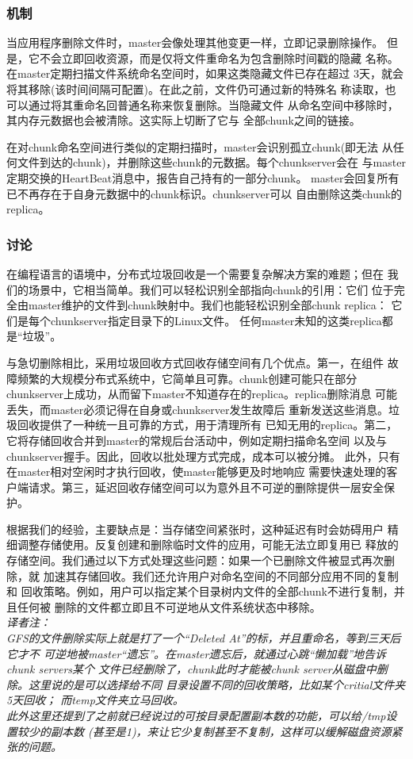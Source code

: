 \subsubsection{机制}
当应用程序删除文件时，master会像处理其他变更一样，立即记录删除操作。
但是，它不会立即回收资源，而是仅将文件重命名为包含删除时间戳的隐藏
名称。在master定期扫描文件系统命名空间时，如果这类隐藏文件已存在超过
3天，就会将其移除(该时间间隔可配置)。在此之前，文件仍可通过新的特殊名
称读取，也可以通过将其重命名回普通名称来恢复删除。当隐藏文件
从命名空间中移除时，其内存元数据也会被清除。这实际上切断了它与
全部chunk之间的链接。

在对chunk命名空间进行类似的定期扫描时，master会识别孤立chunk(即无法
从任何文件到达的chunk)，并删除这些chunk的元数据。每个chunkserver会在
与master定期交换的HeartBeat消息中，报告自己持有的一部分chunk。
master会回复所有已不再存在于自身元数据中的chunk标识。chunkserver可以
自由删除这类chunk的replica。

\subsubsection{讨论}
在编程语言的语境中，分布式垃圾回收是一个需要复杂解决方案的难题；但在
我们的场景中，它相当简单。我们可以轻松识别全部指向chunk的引用：它们
位于完全由master维护的文件到chunk映射中。我们也能轻松识别全部chunk replica：
它们是每个chunkserver指定目录下的Linux文件。
任何master未知的这类replica都是“垃圾”。

与急切删除相比，采用垃圾回收方式回收存储空间有几个优点。第一，在组件
故障频繁的大规模分布式系统中，它简单且可靠。chunk创建可能只在部分
chunkserver上成功，从而留下master不知道存在的replica。replica删除消息
可能丢失，而master必须记得在自身或chunkserver发生故障后
重新发送这些消息。垃圾回收提供了一种统一且可靠的方式，用于清理所有
已知无用的replica。第二，它将存储回收合并到master的常规后台活动中，例如定期扫描命名空间
以及与chunkserver握手。因此，回收以批处理方式完成，成本可以被分摊。
此外，只有在master相对空闲时才执行回收，使master能够更及时地响应
需要快速处理的客户端请求。第三，延迟回收存储空间可以为意外且不可逆的删除提供一层安全保护。


根据我们的经验，主要缺点是：当存储空间紧张时，这种延迟有时会妨碍用户
精细调整存储使用。反复创建和删除临时文件的应用，可能无法立即复用已
释放的存储空间。我们通过以下方式处理这些问题：如果一个已删除文件被显式再次删除，就
加速其存储回收。我们还允许用户对命名空间的不同部分应用不同的复制和
回收策略。例如，用户可以指定某个目录树内文件的全部chunk不进行复制，并且任何被
删除的文件都立即且不可逆地从文件系统状态中移除。
\\\emph{译者注：
\\GFS的文件删除实际上就是打了一个“Deleted At”的标，并且重命名，等到三天后它才不
可逆地被master“遗忘”。在master遗忘后，就通过心跳“懒加载”地告诉chunk servers某个
文件已经删除了，chunk此时才能被chunk server从磁盘中删除。这里说的是可以选择给不同
目录设置不同的回收策略，比如某个critial文件夹5天回收；
而temp文件夹立马回收。
\\此外这里还提到了之前就已经说过的可按目录配置副本数的功能，可以给/tmp设置较少的副本数
(甚至是1)，来让它少复制甚至不复制，这样可以缓解磁盘资源紧张的问题。
}

